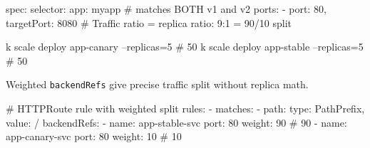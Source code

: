 \begin{tcbitemize}[
  raster columns=2, raster equal height=rows,
  blanker, cheat subtitle
]
  \begin{cheatcodebash}
spec:
  selector: {app: myapp}       # matches BOTH v1 and v2
  ports:
  - {port: 80, targetPort: 8080}
# Traffic ratio = replica ratio: 9:1 = 90/10 split
  \end{cheatcodebash}

  \begin{cheatcodebashbold}
k scale deploy app-canary --replicas=5    # 50%
k scale deploy app-stable --replicas=5    # 50%
  \end{cheatcodebashbold}


  {\sffamily\small Weighted \texttt{backendRefs} give precise traffic split without replica math.}
  \begin{cheatcodebash}
# HTTPRoute rule with weighted split
rules:
  - matches:
      - path: {type: PathPrefix, value: /}
    backendRefs:
      - name: app-stable-svc
        port: 80
        weight: 90           # 90%
      - name: app-canary-svc
        port: 80
        weight: 10           # 10%
  \end{cheatcodebash}

\end{tcbitemize}
